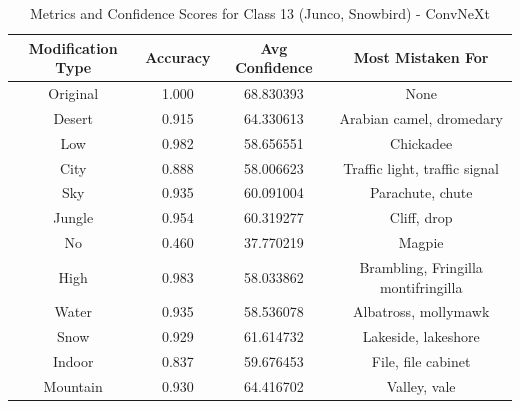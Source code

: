 \begin{table}
	\centering
	\begin{tabular}{|c|c|c|c|}
		\hline
		\textbf{Modification Type} & \textbf{Accuracy} & \textbf{Avg Confidence} & \textbf{Most Mistaken For} \\
		\hline
		Original & 1.000 & 68.830393 & None \\
		\hline
		Desert & 0.915 & 64.330613 & Arabian camel, dromedary \\
		\hline
		Low & 0.982 & 58.656551 & Chickadee \\
		\hline
		City & 0.888 & 58.006623 & Traffic light, traffic signal \\
		\hline
		Sky & 0.935 & 60.091004 & Parachute, chute \\
		\hline
		Jungle & 0.954 & 60.319277 & Cliff, drop \\
		\hline
		No & 0.460 & 37.770219 & Magpie \\
		\hline
		High & 0.983 & 58.033862 & Brambling, Fringilla montifringilla \\
		\hline
		Water & 0.935 & 58.536078 & Albatross, mollymawk \\
		\hline
		Snow & 0.929 & 61.614732 & Lakeside, lakeshore \\
		\hline
		Indoor & 0.837 & 59.676453 & File, file cabinet \\
		\hline
		Mountain & 0.930 & 64.416702 & Valley, vale \\
		\hline
	\end{tabular}
	\caption{Metrics and Confidence Scores for Class 13 (Junco, Snowbird) - ConvNeXt}
	\label{tab:metrics_confidence_class_13_convnext}
\end{table}

